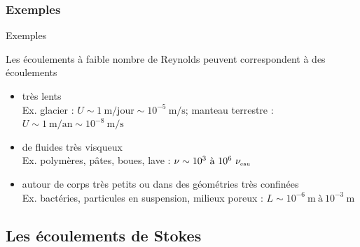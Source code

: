 \subsubsection{Exemples}
\begin{frame}{Exemples}

\small

Les écoulements à faible nombre de Reynolds peuvent correspondent à des écoulements 

\medskip

\begin{itemize}
\item<1->
	très \textcolor{vert}{lents} 
	\\
	Ex. glacier : $U \sim 1\ \mbox{m/jour} \sim 10^{-5}\ 
	\mbox{m/s}$; manteau terrestre : $U \sim 1\ \mbox{m/an} \sim 10^{-8}\ \mbox{m/s}$
	\medskip
\item<2->
	de fluides très \textcolor{vert}{visqueux}
	\\
	Ex. polymères, p\^ates, boues, lave : 
	$\nu \sim 10^3\ \mbox{à}\ 10^6\ \nu_{\mbox{\tiny eau}}$
	\medskip
\item<3->
 	autour de corps très \textcolor{vert}{petits} ou dans des géométries très \textcolor{vert}{confinées}
	\\
	Ex. bactéries, particules en suspension, milieux poreux : $L \sim 10^{-6}\ \mbox{m}\ \mbox{à}\ 10^{-3}\ \mbox{m}$
\end{itemize}

\vspace{25mm}

\end{frame}

%

\subsection{Les écoulements de Stokes}

